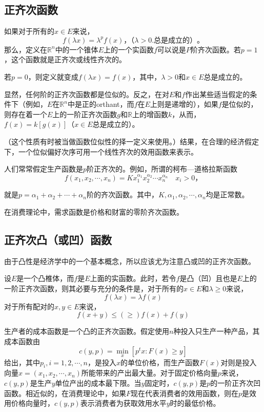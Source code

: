 \subsection{正齐次函数}

如果对于所有的$x \in E$来说，
\[f(\lambda x) = \lambda^p f(x) \text{，（} \lambda >0. \text{总是成立的）} \text{。}\]
那么，定义在$\mathbb{R}^n$中的一个锥体$E$上的一个实函数$f$可以说是$P$阶齐次函数。若$p=1$，这个函数就是正齐次或线性齐次的。

若$p=0$，则定义就变成$f(\lambda x) = f(x)$，其中，$\lambda >0$和$x \in E$总是成立的。

显然，任何阶的正齐次函数都是位似的。反之，在对$E$和$f$作出某些适当假定的条件下（例如，$E$在$\mathbb{R}^n$中是正的orthant，而$f$在$E$上则是递增的），如果$f$是位似的，则存在着一个$E$上的一阶正齐次函数$g$和$\mathbb{R}$上的增函数$k$，从而，$f(x) = k [g(x)]$（$x \in E$总是成立的）。

（这个性质有时被当做函数位似性的择一定义来使用。）结果，在合理的经济假定下，一个位似偏好次序可用一个线性齐次的效用函数来表示。

人们常常假定生产函数是$p$阶正齐次的。例如，所谓的柯布—道格拉斯函数
	\[f(x_1,x_2, \cdots , x_n) = K x_1^{\alpha_1} x_2^{\alpha_2} \cdots x_n^{\alpha_n} \quad x_i > 0 \text{，}\]

就是$p = \alpha_1 + \alpha_2 + \cdots + \alpha_n$阶的齐次函数。其中，$K, \alpha_1, \alpha_2, \cdots , \alpha_n$均是正常数。

在消费理论中，需求函数是价格和财富的零阶齐次函数。

\subsection{正齐次凸（或凹）函数}

由于凸性是经济学中的一个基本概念，所以应该尤为注意凸或凹的正齐次函数。

设$E$是一个凸椎体，而$f$是$E$上面的实函数。此时，若令$f$是凸（凹）且也是$E$上的一阶正齐次函数，则其必要与充分的条件是，对于所有的$x \in E$和$\lambda \ge 0$来说，
\[f(\lambda x) = \lambda f(x)\]
对于所有配对的$x, y \in E$来说，
\[f(x+y) \le (\ge) f(x) + f(y)\]

生产者的成本函数是一个凸的正齐次函数。假定使用$n$种投入只生产一种产品，其成本函数由
\[c(y,p) = \mathop {\min }\limits_x [p^t x:F(x) \ge y]\]
给出，其中$p_i, i=1,2, \cdots,n$，是投入$x$的单位价格，而生产函数$F(x)$对则是投入向量$x=(x_1,x_2,\cdots,x_n)$所能带来的产出最大量。对于固定价格向量$p$来说，$c(y,p)$是生产$y$单位产出的成本最下限。当$y$固定时，$c(y,p)$是$p$的一阶正齐次凹函数。相近似的，在消费理论中，如果$F$现在代表消费者的效用函数，则在$p$是效用价格向量时，$c(y,p)$表示消费者为获取效用水平$y$时的最低价格。

